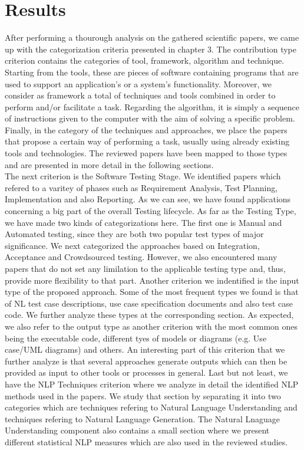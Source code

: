 \chapter{Results}

After performing a thourough analysis on the gathered scientific papers, we came up with the categorization criteria presented in chapter 3. The contribution type criterion contains the categories 
of tool, framework, algorithm and technique. Starting from the tools, these are pieces of software containing programs that are used to support an application's or a system's functionality. 
Moreover, we consider as framework a total of techniques and tools combined in order to perform and/or facilitate a task. Regarding the algorithm, it is simply a sequence of instructions given 
to the computer with the aim of solving a specific problem. Finally, in the category of the techniques and approaches, we place the papers that propose a certain way of performing a task, usually 
using already existing tools and technologies. The reviewed papers have been mapped to those types and are presented in more detail in the following sections. \\

The next criterion is the Software Testing Stage. We identified papers which refered to a varitey of phases such as Requirement Analysis, Test Planning, Implementation and also 
Reporting. As we can see, we have found applications concerning a big part of the overall Testing lifecycle. As far as the Testing Type, we have made two kinds of categorizations here. 
The first one is Manual and Automated testing, since they are both two popular test types of major significance. We next categorized the approaches based on Integration, Acceptance and Crowdsourced testing. 
However, we also encountered many papers that do not set any limilation to the applicable testing type and, thus, provide more flexibility to that part. Another criterion we indentified is the input type of 
the proposed approach. Some of the most frequent types we found is that of NL test case descriptions, use case specification documents and also test case code. We further analyze these types at the 
corresponding section. As expected, we also refer to the output type as another criterion with the most common ones being the executable code, different tyes of models or diagrams (e.g. Use case/UML diagrams) and 
others. An interesting part of this criterion that we further analyze is that several approaches generate outputs which can then be provided as input to other tools or processes in general. Last but not least, we 
have the NLP Techniques criterion where we analyze in detail the identified NLP methods used in the papers. We study that section by separating it into two categories which are techniques refering to Natural 
Language Understanding and techniques refering to Natural Language Generation. The Natural Lnaguage Understanding component also contains a small section where we present different statistical NLP measures which 
are also used in the reviewed studies.\\

